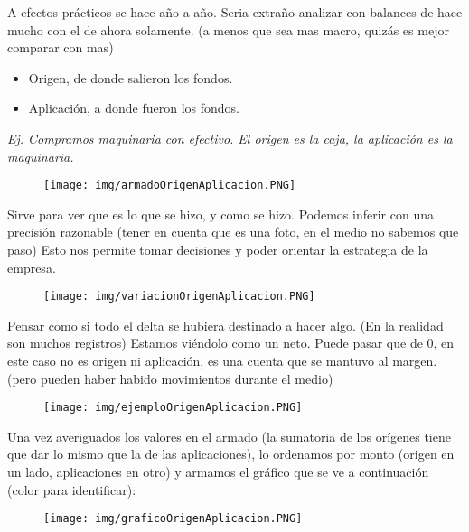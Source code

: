 \documentclass[titlepage,a4paper]{article}
\begin{document}
A efectos prácticos se hace año a año. Seria extraño analizar con balances de hace mucho con el de ahora solamente. (a menos que sea mas macro, quizás es mejor comparar con mas)
\begin{itemize}
    \item Origen, de donde salieron los fondos.
    \item Aplicación, a donde fueron los fondos.
\end{itemize}

\textit{Ej. Compramos maquinaria con efectivo. El origen es la caja, la aplicación es la maquinaria.}

\begin{figure}[!htb]
    \centering
    \texttt{[image: img/armadoOrigenAplicacion.PNG]}
\end{figure}

Sirve para ver que es lo que se hizo, y como se hizo. Podemos inferir con una precisión razonable (tener en cuenta que es una foto, en el medio no sabemos que paso)
Esto nos permite tomar decisiones y poder orientar la estrategia de la empresa.


\begin{figure}[!htb]
    \centering
    \texttt{[image: img/variacionOrigenAplicacion.PNG]}
\end{figure}

Pensar como si todo el delta se hubiera destinado a hacer algo. (En la realidad son muchos registros) Estamos viéndolo como un neto. Puede pasar que de 0, en este caso no es origen ni aplicación, es una cuenta que se mantuvo al margen. (pero pueden haber habido movimientos durante el medio)


\begin{figure}[!htb]
    \centering
    \texttt{[image: img/ejemploOrigenAplicacion.PNG]}
\end{figure}

Una vez averiguados los valores en el armado (la sumatoria de los orígenes tiene que dar lo mismo que la de las aplicaciones), lo ordenamos por monto (origen en un lado, aplicaciones en otro) y armamos el gráfico que se ve a continuación (color para identificar):

\begin{figure}[!htb]
    \centering
    \texttt{[image: img/graficoOrigenAplicacion.PNG]}
\end{figure}
\end{document}
